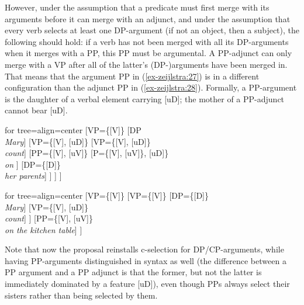 \documentclass[output=paper
,modfonts
,nonflat]{langsci/langscibook}
\begin{document}
However, under the assumption that a predicate must first merge with its arguments before it can merge with an adjunct, and under the assumption that every verb selects at least one DP-argument (if not an object, then a subject), the following should hold: if a verb has not been merged with all its DP-arguments when it merges with a PP, this PP must be argumental. A PP-adjunct can only merge with a VP after all of the latter’s (DP-)arguments have been merged in. That means that the argument PP in (\ref{ex-zeijlstra:27}) is in a different configuration than the adjunct PP in (\ref{ex-zeijlstra:28}). Formally, a PP-argument is the daughter of a verbal element carrying [uD]; the mother of a PP-adjunct cannot bear [uD]. 


	\begin{exe}
		\ex\label{ex-zeijlstra:27}
			\begin{forest}	for tree={align=center}
				[VP{=}\{{[}V{]}\}
				[DP\\ \textit{Mary}]
				[VP{=}\{{[}V{]}{,} {[}uD{]}\}
				[VP{=}\{{[}V{]}{,} {[}uD{]}\}\\ \textit{count}]
				[PP{=}\{{[}V{]}{,} {[}uV{]}\}
				[P{=}\{{[}V{]}{,} {[}uV{]}\}{,} {[}uD{]}\}\\ \textit{on} ]
				[DP{=}\{{[}D{]}\}\\ \textit{her parents}]
				] ] ] 
		\end{forest}
		\end{exe}
		\begin{exe}
        \ex\label{ex-zeijlstra:28}
			\begin{forest}	for tree={align=center}
				[VP{=}\{{[}V{]}\}
				[VP{=}\{{[}V{]}\}
				[DP{=}\{{[}D{]}\}\\ \textit{Mary}]
				[VP{=}\{{[}V{]}{,} {[}uD{]}\}\\ \textit{count}] ]
				[PP{=}\{{[}V{]}{,} {[}uV{]}\} \\ \textit{on the kitchen table}] ] 
		\end{forest}
	\end{exe}
\noindent Note that now the proposal reinstalls c-selection for DP/CP-arguments, while having PP-arguments distinguished in syntax as well (the difference between a PP argument and a PP adjunct is that the former, but not the latter is immediately dominated by a feature [uD]), even though PPs always select their sisters rather than being selected by them.
\end{document}
